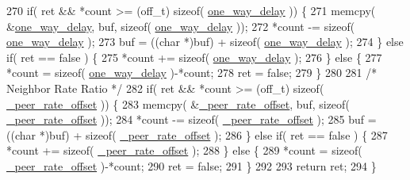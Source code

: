 \begin{DoxyCode}
270     \textcolor{keywordflow}{if}( ret && *count >= (off\_t) \textcolor{keyword}{sizeof}( \hyperlink{class_common_port_ac6f52fcdc0bbe5e322f5435e494bb827}{one\_way\_delay} )) \{
271         memcpy( &\hyperlink{class_common_port_ac6f52fcdc0bbe5e322f5435e494bb827}{one\_way\_delay}, buf, \textcolor{keyword}{sizeof}( \hyperlink{class_common_port_ac6f52fcdc0bbe5e322f5435e494bb827}{one\_way\_delay} ));
272         *count -= \textcolor{keyword}{sizeof}( \hyperlink{class_common_port_ac6f52fcdc0bbe5e322f5435e494bb827}{one\_way\_delay} );
273         buf = ((\textcolor{keywordtype}{char} *)buf) + \textcolor{keyword}{sizeof}( \hyperlink{class_common_port_ac6f52fcdc0bbe5e322f5435e494bb827}{one\_way\_delay} );
274     \} \textcolor{keywordflow}{else} \textcolor{keywordflow}{if}( ret == \textcolor{keyword}{false} ) \{
275         *count += \textcolor{keyword}{sizeof}( \hyperlink{class_common_port_ac6f52fcdc0bbe5e322f5435e494bb827}{one\_way\_delay} );
276     \} \textcolor{keywordflow}{else} \{
277         *count = \textcolor{keyword}{sizeof}( \hyperlink{class_common_port_ac6f52fcdc0bbe5e322f5435e494bb827}{one\_way\_delay} )-*count;
278         ret = \textcolor{keyword}{false};
279     \}
280 
281     \textcolor{comment}{/* Neighbor Rate Ratio */}
282     \textcolor{keywordflow}{if}( ret && *count >= (off\_t) \textcolor{keyword}{sizeof}( \hyperlink{class_common_port_a43c379422577226fdb4f3d0992c3bcea}{\_peer\_rate\_offset} )) \{
283         memcpy( &\hyperlink{class_common_port_a43c379422577226fdb4f3d0992c3bcea}{\_peer\_rate\_offset}, buf, \textcolor{keyword}{sizeof}( 
      \hyperlink{class_common_port_a43c379422577226fdb4f3d0992c3bcea}{\_peer\_rate\_offset} ));
284         *count -= \textcolor{keyword}{sizeof}( \hyperlink{class_common_port_a43c379422577226fdb4f3d0992c3bcea}{\_peer\_rate\_offset} );
285         buf = ((\textcolor{keywordtype}{char} *)buf) + \textcolor{keyword}{sizeof}( \hyperlink{class_common_port_a43c379422577226fdb4f3d0992c3bcea}{\_peer\_rate\_offset} );
286     \} \textcolor{keywordflow}{else} \textcolor{keywordflow}{if}( ret == \textcolor{keyword}{false} ) \{
287         *count += \textcolor{keyword}{sizeof}( \hyperlink{class_common_port_a43c379422577226fdb4f3d0992c3bcea}{\_peer\_rate\_offset} );
288     \} \textcolor{keywordflow}{else} \{
289         *count = \textcolor{keyword}{sizeof}( \hyperlink{class_common_port_a43c379422577226fdb4f3d0992c3bcea}{\_peer\_rate\_offset} )-*count;
290         ret = \textcolor{keyword}{false};
291     \}
292 
293     \textcolor{keywordflow}{return} ret;
294 \}
\end{DoxyCode}


